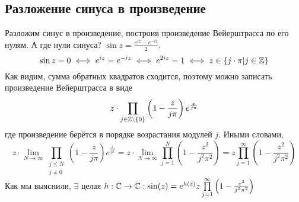 \documentclass[a4paper]{report}
\begin{document}
    \subsection{Разложение синуса в произведение}
    Разложим синус в произведение, построив произведение Вейерштрасса по его нулям.
    А где нули синуса?
    $\sin z = \frac{e^{iz} - e^{-iz}}{2}$.
    \[\sin z = 0 \iff e^{iz} = e^{-iz} \iff e^{2iz} = 1 \iff z \in \left\{j \cdot \pi\middle|j \in \mathbb{Z}\right\}\]
    Как видим, сумма обратных квадратов сходится, поэтому можно записать произведение Вейерштрасса в виде
    \[z\cdot\prod\limits_{j \in \mathbb{Z} \setminus \{0\}}\left(1 - \frac{z}{j \pi}\right)e^{\frac{z}{j\pi}}\]
    где произведение берётся в порядке возрастания модулей $j$.
    Иными словами, \[z \cdot \lim\limits_{N \to \infty}\prod\limits_{\substack{j \le N \\ j \ne 0}}\left(1 - \frac{z}{j \pi}\right)e^{\frac{z}{j\pi}} = z \cdot \lim\limits_{N \to \infty}\prod\limits_{j = 1}^{N}\left(1 - \frac{z^2}{j^2 \pi^2}\right) = z \prod\limits_{j = 1}^{\infty}\left(1 - \frac{z^2}{j^2 \pi^2}\right)\]
    Как мы выяснили, $\exists$ целая $h: \mathbb{C} \rightarrow \mathbb{C}: \sin(z) = e^{h(z)} z \prod\limits_{j = 1}^{\infty}\left(1 - \frac{z^2}{j^2 \pi^2}\right)$
\end{document}
